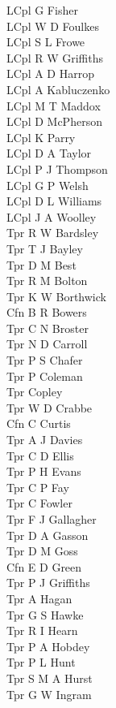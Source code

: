 \begin{multicols}{3}
  LCpl G Fisher \\
  LCpl W D Foulkes \\
  LCpl S L Frowe \\
  LCpl R W Griffiths \\
  LCpl A D Harrop \\
  LCpl A Kabluczenko \\
  LCpl M T Maddox \\
  LCpl D McPherson \\
  LCpl K Parry \\
  LCpl D A Taylor \\
  LCpl P J Thompson \\
  LCpl G P Welsh \\
  LCpl D L Williams \\
  LCpl J A Woolley \\
  Tpr R W Bardsley \\
  Tpr T J Bayley \\
  Tpr D M Best \\
  Tpr R M Bolton \\
  Tpr K W Borthwick \\
  Cfn B R Bowers \\
  Tpr C N Broster \\
  Tpr N D Carroll \\
  Tpr P S Chafer \\
  Tpr P Coleman \\
  Tpr Copley \\
  Tpr W D Crabbe \\
  Cfn C Curtis \\
  Tpr A J Davies \\
  Tpr C D Ellis \\
  Tpr P H Evans \\
  Tpr C P Fay \\
  Tpr C Fowler \\
  Tpr F J Gallagher \\
  Tpr D A Gasson \\
  Tpr D M Goss \\
  Cfn E D Green \\
  Tpr P J Griffiths \\
  Tpr A Hagan \\
  Tpr G S Hawke \\
  Tpr R I Hearn \\
  Tpr P A Hobdey \\
  Tpr P L Hunt \\
  Tpr S M A Hurst \\
  Tpr G W Ingram \\

\end{multicols}
